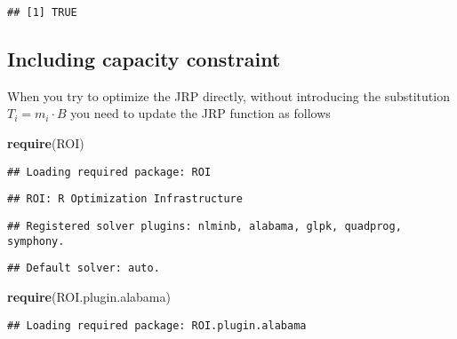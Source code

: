 \documentclass[
]{article}
\newenvironment{Shaded}{\begin{snugshade}}{\end{snugshade}}
\newcommand{\KeywordTok}[1]{\textcolor[rgb]{0.13,0.29,0.53}{\textbf{#1}}}
\newcommand{\NormalTok}[1]{#1}
\begin{document}
\begin{verbatim}
## [1] TRUE
\end{verbatim}

\hypertarget{including-capacity-constraint}{%
\subsection{Including capacity
constraint}\label{including-capacity-constraint}}

When you try to optimize the JRP directly, without introducing the
substitution \(T_i = m_i \cdot B\) you need to update the JRP function
as follows

\begin{Shaded}
\begin{Highlighting}[]
\KeywordTok{require}\NormalTok{(ROI)}
\end{Highlighting}
\end{Shaded}

\begin{verbatim}
## Loading required package: ROI
\end{verbatim}

\begin{verbatim}
## ROI: R Optimization Infrastructure
\end{verbatim}

\begin{verbatim}
## Registered solver plugins: nlminb, alabama, glpk, quadprog, symphony.
\end{verbatim}

\begin{verbatim}
## Default solver: auto.
\end{verbatim}

\begin{Shaded}
\begin{Highlighting}[]
\KeywordTok{require}\NormalTok{(ROI.plugin.alabama)}
\end{Highlighting}
\end{Shaded}

\begin{verbatim}
## Loading required package: ROI.plugin.alabama
\end{verbatim}
\end{document}
